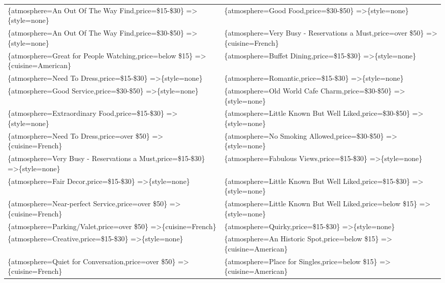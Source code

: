 \documentclass[letterpaper,10pt]{article}
\begin{document}
\begin{appendices}
\begin{table}[h]
\begin{adjustbox}{max width=\textwidth}
\begin{tabular}{ll}
\{atmosphere=An Out Of The Way Find,price=\$15-\$30\} =\textgreater \{style=none\} & \{atmosphere=Good Food,price=\$30-\$50\} =\textgreater \{style=none\} \\ 
\{atmosphere=An Out Of The Way Find,price=\$30-\$50\} =\textgreater \{style=none\} & \{atmosphere=Very Busy - Reservations a Must,price=over \$50\} =\textgreater \{cuisine=French\} \\ 
\{atmosphere=Great for People Watching,price=below \$15\} =\textgreater \{cuisine=American\} & \{atmosphere=Buffet Dining,price=\$15-\$30\} =\textgreater \{style=none\} \\ 
\{atmosphere=Need To Dress,price=\$15-\$30\} =\textgreater \{style=none\} & \{atmosphere=Romantic,price=\$15-\$30\} =\textgreater \{style=none\} \\ 
\{atmosphere=Good Service,price=\$30-\$50\} =\textgreater \{style=none\} & \{atmosphere=Old World Cafe Charm,price=\$30-\$50\} =\textgreater \{style=none\} \\ 
\{atmosphere=Extraordinary Food,price=\$15-\$30\} =\textgreater \{style=none\} & \{atmosphere=Little Known But Well Liked,price=\$30-\$50\} =\textgreater \{style=none\} \\ 
\{atmosphere=Need To Dress,price=over \$50\} =\textgreater \{cuisine=French\} & \{atmosphere=No Smoking Allowed,price=\$30-\$50\} =\textgreater \{style=none\} \\ 
\{atmosphere=Very Busy - Reservations a Must,price=\$15-\$30\} =\textgreater \{style=none\} & \{atmosphere=Fabulous Views,price=\$15-\$30\} =\textgreater \{style=none\} \\ 
\{atmosphere=Fair Decor,price=\$15-\$30\} =\textgreater \{style=none\} & \{atmosphere=Little Known But Well Liked,price=\$15-\$30\} =\textgreater \{style=none\} \\ 
\{atmosphere=Near-perfect Service,price=over \$50\} =\textgreater \{cuisine=French\} & \{atmosphere=Little Known But Well Liked,price=below \$15\} =\textgreater \{style=none\} \\ 
\{atmosphere=Parking/Valet,price=over \$50\} =\textgreater \{cuisine=French\} & \{atmosphere=Quirky,price=\$15-\$30\} =\textgreater \{style=none\} \\ 
\{atmosphere=Creative,price=\$15-\$30\} =\textgreater \{style=none\} & \{atmosphere=An Historic Spot,price=below \$15\} =\textgreater \{cuisine=American\} \\ 
\{atmosphere=Quiet for Conversation,price=over \$50\} =\textgreater \{cuisine=French\} & \{atmosphere=Place for Singles,price=below \$15\} =\textgreater \{cuisine=American\} \\ 

\end{tabular}
\end{adjustbox}
\end{table}
\end{appendices}
\end{document}
